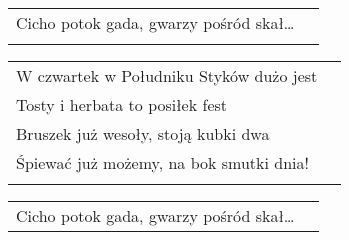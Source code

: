 \documentclass[a5paper]{article}
\begin{document}
\noindent
\begin{tabular}{@{}p{8.5cm}p{3cm}@{}} 
Cicho potok gada, gwarzy pośród skał…\\ \\
\end{tabular}

\noindent
\begin{tabular}{@{}p{9.5cm}p{3cm}@{}}
W czwartek w Południku Styków dużo jest \\
Tosty i herbata to posiłek fest  \\
Bruszek już wesoły, stoją kubki dwa \\
Śpiewać już możemy, na bok smutki dnia! \\ \\
\end{tabular}

\noindent
\begin{tabular}{@{}p{8.5cm}p{3cm}@{}}
Cicho potok gada, gwarzy pośród skał…
\end{tabular}
\end{document}
